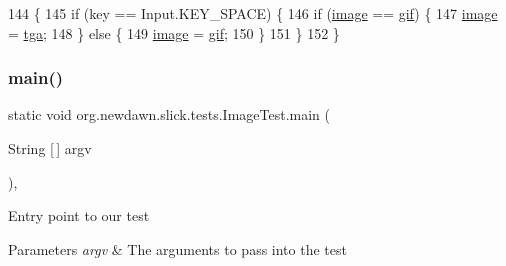 \begin{DoxyCode}
144                                             \{
145         \textcolor{keywordflow}{if} (key == Input.KEY\_SPACE) \{
146             \textcolor{keywordflow}{if} (\mbox{\hyperlink{classorg_1_1newdawn_1_1slick_1_1tests_1_1_image_test_a6a3eac1a7e5d2b84a03f6bc68bb042de}{image}} == \mbox{\hyperlink{classorg_1_1newdawn_1_1slick_1_1tests_1_1_image_test_a382ccf0243ecc6050b7a56037fd71f54}{gif}}) \{
147                 \mbox{\hyperlink{classorg_1_1newdawn_1_1slick_1_1tests_1_1_image_test_a6a3eac1a7e5d2b84a03f6bc68bb042de}{image}} = \mbox{\hyperlink{classorg_1_1newdawn_1_1slick_1_1tests_1_1_image_test_a7ab57bed77d7042ab2204139e041b466}{tga}};
148             \} \textcolor{keywordflow}{else} \{
149                 \mbox{\hyperlink{classorg_1_1newdawn_1_1slick_1_1tests_1_1_image_test_a6a3eac1a7e5d2b84a03f6bc68bb042de}{image}} = \mbox{\hyperlink{classorg_1_1newdawn_1_1slick_1_1tests_1_1_image_test_a382ccf0243ecc6050b7a56037fd71f54}{gif}};
150             \}
151         \}
152     \}
\end{DoxyCode}
\mbox{\label{classorg_1_1newdawn_1_1slick_1_1tests_1_1_image_test_ab8dd8d019fe70989bbd2f75354d48c50}} 
\subsubsection{\texorpdfstring{main()}{main()}}
{\footnotesize\ttfamily static void org.\+newdawn.\+slick.\+tests.\+Image\+Test.\+main (\begin{DoxyParamCaption}\item[{String \mbox{[}$\,$\mbox{]}}]{argv }\end{DoxyParamCaption})\hspace{0.3cm}{\ttfamily [inline]}, {\ttfamily [static]}}

Entry point to our test


\begin{DoxyParams}{Parameters}
{\em argv} & The arguments to pass into the test \\
\hline
\end{DoxyParams}

